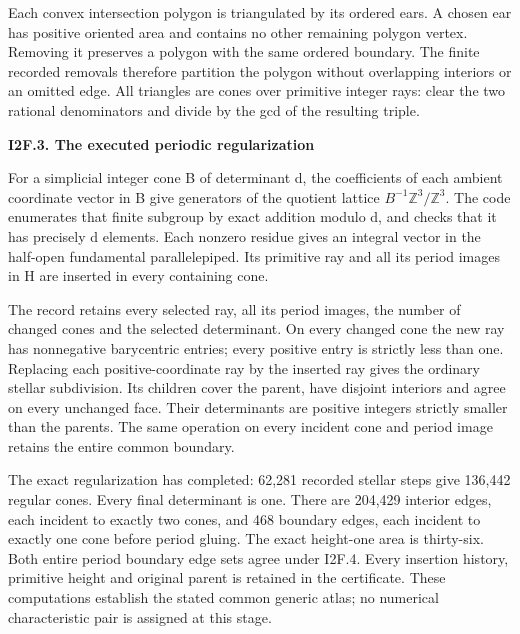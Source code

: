 Each convex intersection polygon is triangulated
by its ordered ears. A chosen ear has positive
oriented area and contains no other remaining
polygon vertex. Removing it preserves a polygon
with the same ordered boundary. The finite
recorded removals therefore partition the polygon
without overlapping interiors or an omitted edge.
All triangles are cones over primitive integer
rays: clear the two rational denominators and
divide by the gcd of the resulting triple.

\par

\medskip\noindent\textbf{I2F.3. The executed periodic regularization}

\par\nobreak

For a simplicial integer cone B of determinant d,
the coefficients of each ambient coordinate
vector in B give generators of the quotient
lattice \(B^{-1} \mathbb Z^{3}/\mathbb Z^{3}\). The code enumerates that
finite subgroup by exact addition modulo d,
and checks that it has precisely d elements.
Each nonzero residue gives an integral vector
in the half-open fundamental parallelepiped.
Its primitive ray and all its period images
in H are inserted in every containing cone.

The record retains every selected ray, all its
period images, the number of changed cones and
the selected determinant. On every changed cone
the new ray has nonnegative barycentric entries;
every positive entry is strictly less than one.
Replacing each positive-coordinate ray by the
inserted ray gives the ordinary stellar
subdivision. Its children cover the parent,
have disjoint interiors and agree on every
unchanged face. Their determinants are positive
integers strictly smaller than the parent\textquotesingle s.
The same operation on every incident cone and
period image retains the entire common boundary.

The exact regularization has completed: 62,281 recorded stellar
steps give 136,442 regular cones. Every final determinant is one.
There are 204,429 interior edges, each incident to exactly two cones,
and 468 boundary edges, each incident to exactly one cone before
period gluing. The exact height-one area is thirty-six. Both entire
period boundary edge sets agree under I2F.4. Every insertion history,
primitive height and original parent is retained in the certificate.
These computations establish the stated common generic atlas; no
numerical characteristic pair is assigned at this stage.

